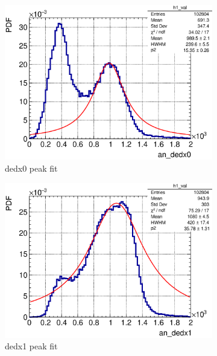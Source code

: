   \begin{figure}[t]
    \centering
    \begin{subfigure}{\dbfigwid\textwidth}
         \includegraphics[width=\textwidth]{figures/sel/ans_dedx0_pdf_al2_selpr_con_test.eps}
         \caption{dedx0 peak fit}
         \label{subfig:dedx0-peak}
    \end{subfigure}
    \begin{subfigure}{\dbfigwid\textwidth}
         \includegraphics[width=\textwidth]{figures/sel/ans_dedx1_pdf_al2_selpr_con_test.eps}
         \caption{dedx1 peak fit}
         \label{subfig:dedx1-peak}
    \end{subfigure}
    \\
    \begin{subfigure}{\dbfigwid\textwidth}

\end{subfigure}
\end{figure}
